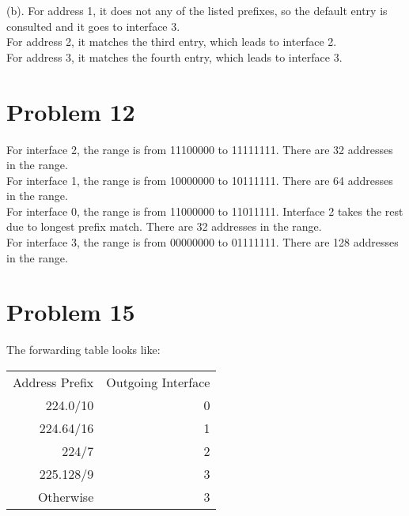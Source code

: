 \documentclass[titlepage, paper=a4, fontsize=11pt]{scrartcl} %
\numberwithin{equation}{section} %
\numberwithin{table}{section} %
\begin{document}
(b).
For address 1, it does not any of the listed prefixes, so the default entry is consulted and it goes to interface 3. \\
For address 2, it matches the third entry, which leads to interface 2. \\
For address 3, it matches the fourth entry, which leads to interface 3. \\




\section*{Problem 12}
For interface 2, the range is from 11100000 to 11111111. There are 32 addresses in the range. \\
For interface 1, the range is from 10000000 to 10111111. There are 64 addresses in the range. \\
For interface 0, the range is from 11000000 to 11011111. Interface 2 takes the rest due to longest prefix match. There are 32 addresses in the range. \\
For interface 3, the range is from 00000000 to 01111111. There are 128 addresses in the range. \\





\section*{Problem 15}
The forwarding table looks like: \\
\begin{tabular}{ r | r  }
  Address Prefix & Outgoing Interface \\
  224.0/10 & 0 \\
  224.64/16 & 1 \\
  224/7 & 2 \\
  225.128/9 & 3 \\
  Otherwise & 3 \\
\end{tabular}
\\
\end{document}
